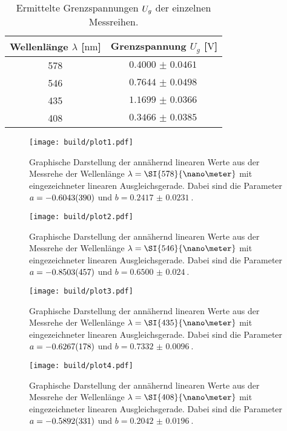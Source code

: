 \begin{table}
    \caption{Ermittelte Grenzspannungen $\protect U_{g}$ der einzelnen Messreihen.}
    \centering
    \label{tab:ugrenz}
    \begin{tabular}{c c}
        \toprule
        Wellenlänge $\lambda$ [$\si{\nano\meter}$] & Grenzspannung $U_{g}$ [$\si{\volt}$] \\
        \midrule
        578 & $\SI{0.4000(461)}{}$\\
        546 & $\SI{0.7644(498)}{}$\\
        435 & $\SI{1.1699(366)}{}$\\
        408 & $\SI{0.3466(385)}{}$\\
        \bottomrule    
    \end{tabular}
\end{table}

\begin{figure}
    \centering
    \texttt{[image: build/plot1.pdf]}
    \caption{Graphische Darstellung der annähernd linearen Werte aus der Messrehe der Wellenlänge $\protect \lambda = \SI{578}{\nano\meter}$ mit eingezeichneter linearen Ausgleichsgerade. Dabei sind die Parameter $\protect a = \SI{-0.6043(390)}{}$ und $b = \SI{0.2417(231)}{}$.} 
    \label{fig:gelb}
\end{figure}

\begin{figure}
    \centering
    \texttt{[image: build/plot2.pdf]}
    \caption{Graphische Darstellung der annähernd linearen Werte aus der Messrehe der Wellenlänge $\protect \lambda = \SI{546}{\nano\meter}$ mit eingezeichneter linearen Ausgleichsgerade. Dabei sind die Parameter $\protect a = \SI{-0.8503(457)}{}$ und $b = \SI{0.6500(240)}{}$.} 
    \label{fig:grün}
\end{figure}

\begin{figure}
    \centering
    \texttt{[image: build/plot3.pdf]}
    \caption{Graphische Darstellung der annähernd linearen Werte aus der Messrehe der Wellenlänge $\protect \lambda = \SI{435}{\nano\meter}$ mit eingezeichneter linearen Ausgleichsgerade. Dabei sind die Parameter $\protect a = \SI{-0.6267(178)}{}$ und $b = \SI{0.7332(96)}{}$.} 
    \label{fig:violet}
\end{figure}

\begin{figure}
    \centering
    \texttt{[image: build/plot4.pdf]}
    \caption{Graphische Darstellung der annähernd linearen Werte aus der Messrehe der Wellenlänge $\protect \lambda = \SI{408}{\nano\meter}$ mit eingezeichneter linearen Ausgleichsgerade. Dabei sind die Parameter $\protect a = \SI{-0.5892(331)}{}$ und $b = \SI{0.2042(196)}{}$.} 
    \label{fig:GIGAviolet}
\end{figure}
\newpage

